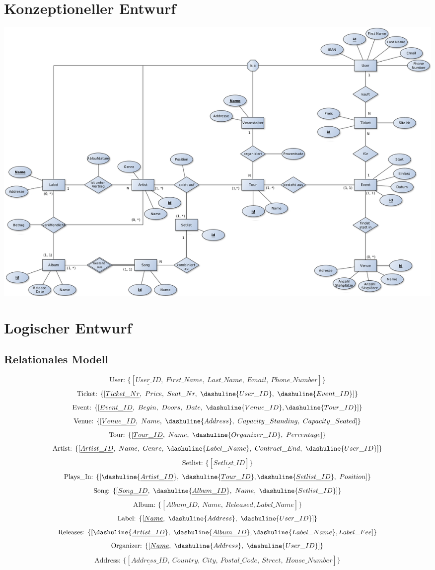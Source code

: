 \documentclass[12pt, oneside, a4paper]{article}
\newcommand{\set}[1]{\{#1\}} %
\newcommand{\relation}[2]{$$\text{{#1}: } \set{[{#2}]}$$}
\begin{document}
\section{Konzeptioneller Entwurf}
\vspace*{\fill}
\begin{adjustbox}{angle=90,center,caption=Entity Relationship Model,nofloat=figure}
	\includegraphics[width=1.4\textwidth]{img/erm_corrected_again.png}
	\label{fig:erm}
\end{adjustbox}





\newpage
\section{Logischer Entwurf}
\subsection{Relationales Modell}

\relation{User}{{\underline{User\_ID}},\ First\_Name,\ Last\_Name,\ Email,\ Phone\_Number}
\relation{Ticket}{\underline{Ticket\_Nr},\ Price,\ Seat\_Nr,\ \dashuline{User\_ID},\ \dashuline{Event\_ID}}
\relation{Event}{\underline{Event\_ID},\ Begin,\ Doors,\ Date,\ \dashuline{Venue\_ID}, \dashuline{Tour\_ID}}
\relation{Venue}{\underline{Venue\_ID},\ Name,\ \dashuline{Address},\ Capacity\_Standing,\ Capacity\_Seated}
\relation{Tour}{\underline{Tour\_ID},\ Name,\ \dashuline{Organizer\_ID},\ Percentage}
\relation{Artist}{\underline{Artist\_ID},\ Name,\ Genre,\ \dashuline{Label\_Name},\ Contract\_End,\ \dashuline{User\_ID}}
\relation{Setlist}{\underline{Setlist\_ID}}
\relation{Plays\_In}{\dashuline{\underline{Artist\_ID}},\ \dashuline{\underline{Tour\_ID}}, \dashuline{\underline{Setlist\_ID}},\ Position}
\relation{Song}{\underline{Song\_ID},\ \dashuline{\underline{Album\_ID}},\ Name,\ \dashuline{Setlist\_ID}}
\relation{Album}{\underline{Album\_ID},\ Name,\ Released, Label\_Name}
\relation{Label}{\underline{Name},\ \dashuline{Address},\ \dashuline{User\_ID}}
\relation{Releases}{\dashuline{\underline{Artist\_ID}},\ \dashuline{\underline{Album\_ID}}, \dashuline{{Label\_Name}}, Label\_Fee}
\relation{Organizer}{\underline{Name},\ \dashuline{Address},\ \dashuline{User\_ID}}
\relation{Address}{\underline{Address\_ID},\ Country,\ City,\ Postal\_Code,\ Street,\ House\_Number}
\end{document}
